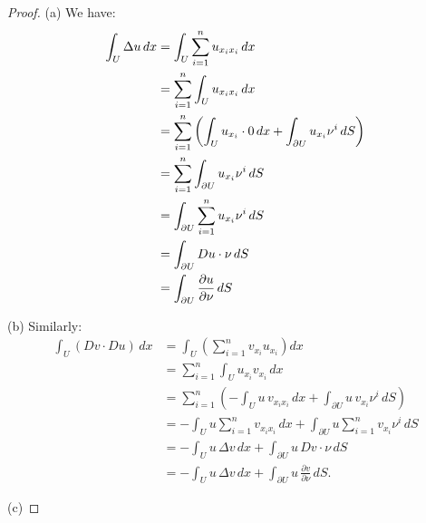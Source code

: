\documentclass[10pt,oneside,openany]{memoir}
\begin{document}
    \begin{proof}
        (a) We have:
            \begin{equation*}
            \begin{split}
                \int_U \Delta u \, dx
                &= \int_U \sum_{i=1}^n u_{x_i x_i} \, dx \\
                &= \sum_{i=1}^n \int_U u_{x_i x_i} \, dx \\
                &= \sum_{i=1}^n \left( \int_U u_{x_i} \cdot 0 \, dx + \int_{\partial U} u_{x_i}\nu^i \, dS \right) \\
                &= \sum_{i=1}^n \int_{\partial U} u_{x_i}\nu^i \, dS \\
                &= \int_{\partial U} \sum_{i=1}^n u_{x_i}\nu^i \, dS \\
                &= \int_{\partial U} Du \cdot \nu \, dS \\
                &= \int_{\partial U} \frac{\partial u}{\partial \nu} \, dS \qedhere
            \end{split}
            \end{equation*}

        (b) Similarly:
            \begin{equation*}
            \begin{split}
                \int_U (Dv \cdot Du)\, dx
                &= \int_U \left( \sum_{i=1}^n v_{x_i} u_{x_i} \right) dx \\
                &= \sum_{i=1}^n \int_U u_{x_i} v_{x_i}\, dx \\
                &= \sum_{i=1}^n \left( - \int_U u\, v_{x_i x_i}\, dx + \int_{\partial U} u\, v_{x_i}\nu^i\, dS \right) \\
                &= - \int_U u \sum_{i=1}^n v_{x_i x_i}\, dx + \int_{\partial U} u \sum_{i=1}^n v_{x_i}\nu^i\, dS \\
                &= - \int_U u\, \Delta v\, dx + \int_{\partial U} u\, Dv \cdot \nu\, dS \\
                &= - \int_U u\, \Delta v\, dx + \int_{\partial U} u\, \frac{\partial v}{\partial \nu}\, dS.
            \end{split}
            \end{equation*}

        (c) \vspace{300pt}
    \end{proof}
\end{document}
